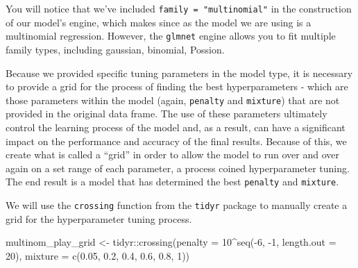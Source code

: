 \documentclass[
  letterpaper,
]{krantz}
\newenvironment{Shaded}{\begin{snugshade}}{\end{snugshade}}
\newcommand{\AttributeTok}[1]{\textcolor[rgb]{0.40,0.45,0.13}{#1}}
\newcommand{\DecValTok}[1]{\textcolor[rgb]{0.68,0.00,0.00}{#1}}
\newcommand{\FloatTok}[1]{\textcolor[rgb]{0.68,0.00,0.00}{#1}}
\newcommand{\FunctionTok}[1]{\textcolor[rgb]{0.28,0.35,0.67}{#1}}
\newcommand{\NormalTok}[1]{\textcolor[rgb]{0.00,0.23,0.31}{#1}}
\newcommand{\OtherTok}[1]{\textcolor[rgb]{0.00,0.23,0.31}{#1}}
\newcommand{\SpecialCharTok}[1]{\textcolor[rgb]{0.37,0.37,0.37}{#1}}
\begin{document}
\begin{tcolorbox}[enhanced jigsaw, colback=white, leftrule=.75mm, breakable, colframe=quarto-callout-note-color-frame, bottomtitle=1mm, rightrule=.15mm, left=2mm, opacityback=0, bottomrule=.15mm, arc=.35mm, coltitle=black, colbacktitle=quarto-callout-note-color!10!white, toptitle=1mm, titlerule=0mm, title=\textcolor{quarto-callout-note-color}{\faInfo}\hspace{0.5em}{Note}, toprule=.15mm, opacitybacktitle=0.6]

You will notice that we've included \texttt{family\ =\ "multinomial"} in
the construction of our model's engine, which makes since as the model
we are using is a multinomial regression. However, the \texttt{glmnet}
engine allows you to fit multiple family types, including gaussian,
binomial, Possion.

\end{tcolorbox}

Because we provided specific tuning parameters in the model type, it is
necessary to provide a grid for the process of finding the best
hyperparameters - which are those parameters within the model (again,
\texttt{penalty} and \texttt{mixture}) that are not provided in the
original data frame. The use of these parameters ultimately control the
learning process of the model and, as a result, can have a significant
impact on the performance and accuracy of the final results. Because of
this, we create what is called a ``grid'' in order to allow the model to
run over and over again on a set range of each parameter, a process
coined hyperparameter tuning. The end result is a model that has
determined the best \texttt{penalty} and \texttt{mixture}.

We will use the \texttt{crossing} function from the \texttt{tidyr}
package to manually create a grid for the hyperparameter tuning process.

\begin{Shaded}
\begin{Highlighting}[]
\NormalTok{multinom\_play\_grid }\OtherTok{\textless{}{-}}\NormalTok{ tidyr}\SpecialCharTok{::}\FunctionTok{crossing}\NormalTok{(}\AttributeTok{penalty =} \DecValTok{10}\SpecialCharTok{\^{}}\FunctionTok{seq}\NormalTok{(}\SpecialCharTok{{-}}\DecValTok{6}\NormalTok{, }\SpecialCharTok{{-}}\DecValTok{1}\NormalTok{,}
                                                       \AttributeTok{length.out =} \DecValTok{20}\NormalTok{),}
                                      \AttributeTok{mixture =} \FunctionTok{c}\NormalTok{(}\FloatTok{0.05}\NormalTok{, }\FloatTok{0.2}\NormalTok{,}
                                                  \FloatTok{0.4}\NormalTok{, }\FloatTok{0.6}\NormalTok{,}
                                                  \FloatTok{0.8}\NormalTok{, }\DecValTok{1}\NormalTok{))}
\end{Highlighting}
\end{Shaded}
\end{document}
